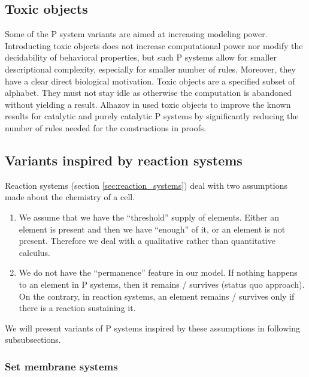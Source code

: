 \subsection{Toxic objects} %
\label{sub:toxic_objects}

Some of the P system variants are aimed at increasing modeling power. Introducting toxic objects \cite{Alhazov14Toxic} does not increase computational power nor modify the decidability of behavioral properties, but such P systems allow for smaller descriptional complexity, especially for smaller number of rules. Moreover, they have a clear direct biological motivation.
Toxic objects are a specified subset of alphabet. They must not stay idle as otherwise the computation is abandoned without yielding a result. 
Alhazov in \cite{Alhazov14Toxic} used toxic objects to improve the known results for catalytic and purely catalytic P systems by significantly reducing the number of rules needed for the constructions in proofs. 


\subsection{Variants inspired by reaction systems} %
\label{sub:variants_inspired_by_reaction_systems}

Reaction systems (section \ref{sec:reaction_systems}) deal with two assumptions made about the chemistry of a cell.
\begin{enumerate}
  \item We assume that we have the ``threshold'' supply of elements. Either an element is present and then we have ``enough'' of it, or an element is not present. Therefore we deal with a qualitative rather than quantitative calculus.
  \item We do not have the ``permanence'' feature in our model. If nothing happens to an element in P systems, then it remains / survives (status quo approach). On the contrary, in reaction systems, an element remains / survives only if there is a reaction sustaining it. 
\end{enumerate}

We will present variants of P systems inspired by these assumptions in following subsubsections.

\subsubsection{Set membrane systems} %
\label{ssub:set_membrane_systems}

